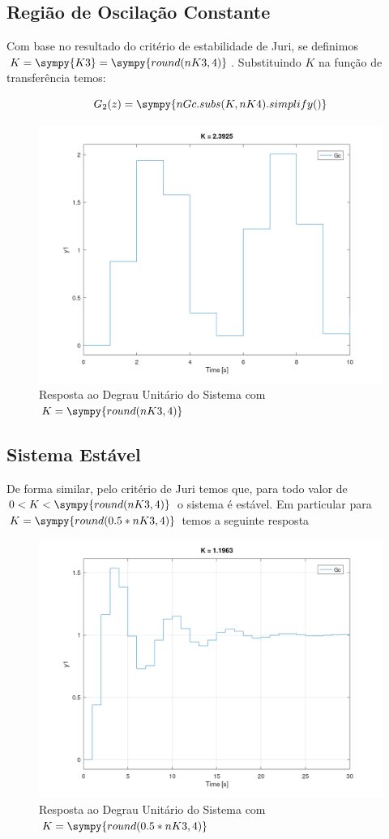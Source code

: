 \documentclass[a4paper,11pt]{article}
\newcommand{\npy}[1]{\sympy{round(#1,4)}}
\begin{document}
\subsection{Região de Oscilação Constante}

Com base no resultado do critério de estabilidade de Juri, se definimos $K = \sympy{K3}= \npy{nK3}$. Substituindo $K$ na função de transferência temos:

\begin{equation}\label{eq:closedloop-sys-oscilation}
    G_{2}(z) = \sympy{nGc.subs(K,nK4).simplify()}
\end{equation}

\begin{figure}[H]
    \centering
    \includegraphics[width=0.8\linewidth]{img/exsim1-plot-oscilation.png}
    \caption{Resposta ao Degrau Unitário do Sistema com $K = \npy{nK3}$}
\end{figure}

\subsection{Sistema Estável}

De forma similar, pelo critério de Juri temos que, para todo valor de $0< K < \npy{nK3}$ o sistema é estável. Em particular para $K = \npy{0.5*nK3}$ temos a seguinte resposta

\begin{figure}[H]
    \centering
    \includegraphics[width=0.8\linewidth]{img/exsim1-plot-stable.png}
    \caption{Resposta ao Degrau Unitário do Sistema com $K = \npy{0.5*nK3}$}
\end{figure}
\end{document}
